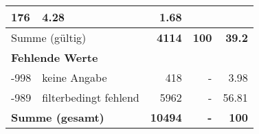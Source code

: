 \begin{longtable}{lXrrr}
       \num{176} &
       \num[round-mode=places,round-precision=2]{4,28} &
         \num[round-mode=places,round-precision=2]{1,68} \\
     \midrule
     \multicolumn{2}{l}{Summe (gültig)} &
       \textbf{\num{4114}} &
     \textbf{100} &
       \textbf{\num[round-mode=places,round-precision=2]{39,2}} \\
     \multicolumn{5}{l}{\textbf{Fehlende Werte}}\\
       -998 &
       keine Angabe &
         \num{418} &
        - &
         \num[round-mode=places,round-precision=2]{3,98} \\
       -989 &
       filterbedingt fehlend &
         \num{5962} &
        - &
         \num[round-mode=places,round-precision=2]{56,81} \\
     \midrule
     \multicolumn{2}{l}{\textbf{Summe (gesamt)}} &
          \textbf{\num{10494}} &
        \textbf{-} &
        \textbf{100} \\
     \bottomrule
     \end{longtable}
     
